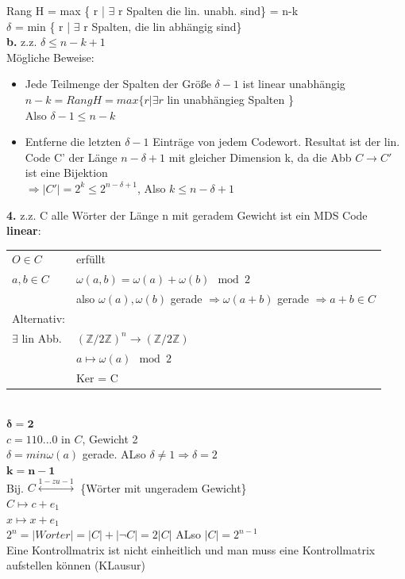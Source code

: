 \documentclass{article} %
\begin{document}
Rang H = max \{ r | $\exists$ r Spalten die lin. unabh. sind\} = n-k \\
$\delta $ = min \{ r | $\exists$ r Spalten, die lin abhängig sind\} \\
\textbf{b.} z.z. $\delta \leq n-k +1$ \\
Mögliche Beweise: 
\begin{itemize}
    \item Jede Teilmenge der Spalten der Größe $\delta-1$ ist linear unabhängig \\
$n-k = Rang H = max \{r | \exists r$ lin unabhängieg Spalten \} \\
Also $\delta-1 \leq n-k$
\item Entferne die letzten $\delta -1$ Einträge von jedem Codewort. Resultat ist der lin. Code C' der Länge $n-\delta +1$ mit gleicher Dimension k, da die Abb $C \longrightarrow C'$ ist eine Bijektion  \\
$\Rightarrow |C'| = 2^k \leq 2^{n-\delta+1}$, Also $k \leq n-\delta+1$
\end{itemize}
\textbf{4.} z.z. C alle Wörter der Länge n mit geradem Gewicht ist ein MDS Code \\
\textbf{linear}: \\
\begin{tabular}{ll}
    $O \in C$ & erfüllt  \\
    $a,b \in C $ & $\omega(a,b) = \omega(a) + \omega(b) \mod 2$ \\
    & also $\omega(a) , \omega(b)$ gerade $\Rightarrow \omega(a+b)$ gerade $\Rightarrow a+b \in C$ \\
    Alternativ:\\
    $\exists$ lin Abb. & $(\mathbb{Z}/ 2 \mathbb{Z})^n \rightarrow (\mathbb{Z}/ 2 \mathbb{Z})$ \\ 
    & $a \mapsto \omega(a) \mod 2$ \\
    & Ker = C
\end{tabular} \\
$\mathbf{\delta = 2}$ \\
$c = 1 1 0 ... 0$ in $C$, Gewicht 2 \\
$\delta = min \omega(a) $ gerade. ALso $\delta \neq 1 \Rightarrow \delta = 2$
\\ 
$\mathbf{k = n-1}$ \\
Bij. $C \overset{1-zu-1}{\leftrightarrow}$ \{Wörter mit ungeradem Gewicht\} \\
$C \mapsto c + e_1$ \\
$x \mapsto x+e_1 $ \\ 
$2^n = |Worter| = |C|+|\neg C| = 2|C|$ ALso $|C| = 2^{n-1}$ \\
\newline
Eine Kontrollmatrix ist nicht einheitlich und man muss eine Kontrollmatrix aufstellen können (KLausur)
\end{document}
